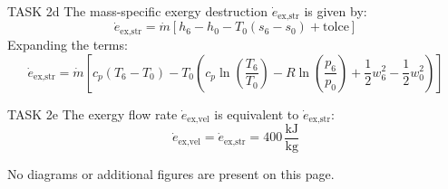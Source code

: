 TASK 2d  
The mass-specific exergy destruction \( \dot{e}_{\text{ex,str}} \) is given by:  
\[
\dot{e}_{\text{ex,str}} = \dot{m} \left[ h_6 - h_0 - T_0 \left( s_6 - s_0 \right) + \text{tolce} \right]
\]  
Expanding the terms:  
\[
\dot{e}_{\text{ex,str}} = \dot{m} \left[ c_p \left( T_6 - T_0 \right) - T_0 \left( c_p \ln \left( \frac{T_6}{T_0} \right) - R \ln \left( \frac{p_6}{p_0} \right) + \frac{1}{2} w_6^2 - \frac{1}{2} w_0^2 \right) \right]
\]  

TASK 2e  
The exergy flow rate \( \dot{e}_{\text{ex,vel}} \) is equivalent to \( \dot{e}_{\text{ex,str}} \):  
\[
\dot{e}_{\text{ex,vel}} = \dot{e}_{\text{ex,str}} = 400 \, \frac{\text{kJ}}{\text{kg}}
\]  

No diagrams or additional figures are present on this page.